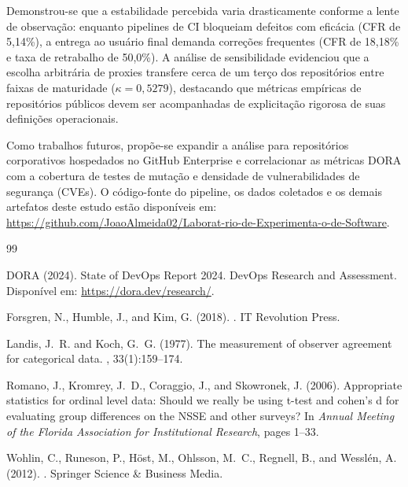 \documentclass[12pt]{article}
\begin{document}
Demonstrou-se que a estabilidade percebida varia drasticamente conforme a lente de observação: enquanto pipelines de CI bloqueiam defeitos com eficácia (CFR de 5,14\%), a entrega ao usuário final demanda correções frequentes (CFR de 18,18\% e taxa de retrabalho de 50,0\%). A análise de sensibilidade evidenciou que a escolha arbitrária de proxies transfere cerca de um terço dos repositórios entre faixas de maturidade ($\kappa = 0{,}5279$), destacando que métricas empíricas de repositórios públicos devem ser acompanhadas de explicitação rigorosa de suas definições operacionais.

Como trabalhos futuros, propõe-se expandir a análise para repositórios corporativos hospedados no GitHub Enterprise e correlacionar as métricas DORA com a cobertura de testes de mutação e densidade de vulnerabilidades de segurança (CVEs). O código-fonte do pipeline, os dados coletados e os demais artefatos deste estudo estão disponíveis em: \url{https://github.com/JoaoAlmeida02/Laborat-rio-de-Experimenta-o-de-Software}.

\begin{small}
\begin{thebibliography}{99}
\setlength{\itemsep}{-1pt}
\setlength{\parskip}{0pt}

DORA (2024).
\newblock State of DevOps Report 2024.
\newblock DevOps Research and Assessment. Disponível em: \url{https://dora.dev/research/}.

Forsgren, N., Humble, J., and Kim, G. (2018).
.
\newblock IT Revolution Press.

Landis, J.~R. and Koch, G.~G. (1977).
\newblock The measurement of observer agreement for categorical data.
, 33(1):159--174.

Romano, J., Kromrey, J.~D., Coraggio, J., and Skowronek, J. (2006).
\newblock Appropriate statistics for ordinal level data: Should we really be using t-test and cohen's d for evaluating group differences on the {NSSE} and other surveys?
\newblock In {\em Annual Meeting of the Florida Association for Institutional Research}, pages 1--33.

Wohlin, C., Runeson, P., H{\"o}st, M., Ohlsson, M.~C., Regnell, B., and Wessl{\'e}n, A. (2012).
.
\newblock Springer Science \& Business Media.

\end{thebibliography}
\end{small}
\end{document}
